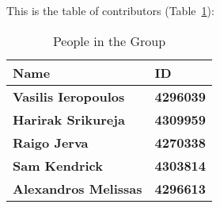 This is the table of contributors (Table~\ref{authors}):
\begin{table}%
\centering
\caption{People in the Group}
\label{authors}
\begin{tabular}{|l|l|}
\textbf{Name} & \textbf{ID} \\
\hline
\textbf{Vasilis Ieropoulos} & \textbf{4296039} \\
\hline
\textbf{Harirak Srikureja} & \textbf{4309959} \\
\hline
\textbf{Raigo Jerva} & \textbf{4270338} \\
\hline
\textbf{Sam Kendrick} & \textbf{4303814} \\
\hline
\textbf{Alexandros Melissas} & \textbf{4296613} \\
\hline
\end{tabular}
\end{table}
